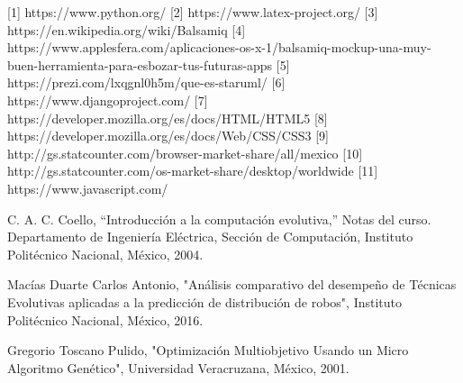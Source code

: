 \label{sec:bibliografia}

		[1] https://www.python.org/
	[2] https://www.latex-project.org/
	[3] https://en.wikipedia.org/wiki/Balsamiq 
	[4] https://www.applesfera.com/aplicaciones-os-x-1/balsamiq-mockup-una-muy-buen-herramienta-para-esbozar-tus-futuras-apps
	[5] https://prezi.com/lxqgnl0h5m/que-es-staruml/
	[6] https://www.djangoproject.com/
	[7] https://developer.mozilla.org/es/docs/HTML/HTML5
	[8] https://developer.mozilla.org/es/docs/Web/CSS/CSS3
	[9] http://gs.statcounter.com/browser-market-share/all/mexico
	[10] http://gs.statcounter.com/os-market-share/desktop/worldwide
		[11]	https://www.javascript.com/
		
	
		C. A. C. Coello, “Introducción a la computación evolutiva,” Notas del curso. Departamento de Ingeniería Eléctrica, Sección de Computación, Instituto Politécnico Nacional, México, 2004.

		Macías Duarte Carlos Antonio, "Análisis comparativo del desempeño de Técnicas Evolutivas aplicadas a la predicción de distribución de robos", Instituto Politécnico Nacional, México, 2016.

		Gregorio Toscano Pulido, "Optimización Multiobjetivo Usando un Micro Algoritmo Genético", Universidad Veracruzana, México, 2001.